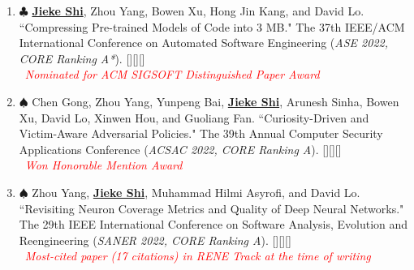 \documentclass{resume}
\begin{document}
  \begin{enumerate}[itemsep=0.1cm]
    \item[\bracketlabel{C7}] $\clubsuit$ \underline{\bf{Jieke Shi}}, Zhou Yang, Bowen Xu, Hong Jin Kang, and David Lo. ``Compressing Pre-trained Models of Code into 3 MB." {\itfont The 37th IEEE/ACM  International Conference on Automated Software Engineering (}{\it ASE 2022, CORE Ranking A*}{\itfont )}. [][][] \\  \textcolor{red}{\faMedal\ \it{Nominated for ACM SIGSOFT Distinguished Paper Award}}

    \item[\bracketlabel{C6}] $\spadesuit$ Chen Gong, Zhou Yang, Yunpeng Bai, \underline{\bf{Jieke Shi}}, Arunesh Sinha, Bowen Xu, David Lo, Xinwen Hou, and Guoliang Fan. ``Curiosity-Driven and Victim-Aware Adversarial Policies." {\itfont The 39th Annual Computer Security Applications Conference (}{\it ACSAC 2022, CORE Ranking A}{\itfont )}. [][][] \\ \textcolor{red}{\faMedal\ \it{Won Honorable Mention Award}}

    \item[\bracketlabel{C5}] $\spadesuit$ Zhou Yang, \underline{\bf{Jieke Shi}}, Muhammad Hilmi Asyrofi, and David Lo. ``Revisiting Neuron Coverage Metrics and Quality of Deep Neural Networks." {\itfont The 29th IEEE International Conference on Software Analysis, Evolution and Reengineering (}{\it SANER 2022, CORE Ranking A}{\itfont )}. [][][] \\
    \textcolor{red}{\faFire\ \it{Most-cited paper (17 citations) in RENE Track at the time of writing}}
  \end{enumerate}

\vspace{-0.2cm}
\end{document}
